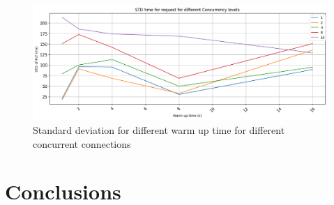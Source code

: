 \documentclass[eng]{class}
\begin{document}
\begin{figure}[H]
  \centering
  \includegraphics[width=\columnwidth]{images/var_warm_up.png}
  \caption{Standard deviation for different warm up time for different concurrent connections}
  \label{fig-8}
\end{figure}

\section{Conclusions}
\end{document}
